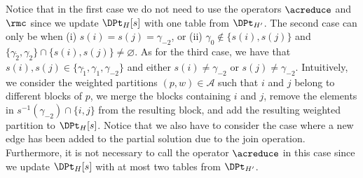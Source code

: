 Notice that in the first case we do not need to use the operators $\acreduce$ and $\rmc$ since we update
$\DPt_H[s]$ with one table from $\DPt_{H'}$.
The second case can only be when (i) $s(i)=s(j)=\gamma_{-2}$,
or (ii) $\gamma_0 \notin \{s(i),s(j)\}$ and
$\{\gamma_{\tilde{2}},\gamma_{2}\} \cap \{s(i),s(j)\} \neq \varnothing$.
As for the third case, we have that $s(i),s(j) \in \{\gamma_{\tilde{1}}, \gamma_{1}, \gamma_{-2}\}$ and
either $s(i) \neq \gamma_{-2}$ or $s(j) \neq \gamma_{-2}$.
Intuitively, we consider the weighted partitions $(p,w) \in \mathcal{A}$ such that
$i$ and $j$ belong to different blocks of $p$,
we merge the blocks containing $i$ and $j$,
remove the elements in $s^{-1}(\gamma_{-2}) \cap \{i,j\}$ from the resulting block,
and add the resulting weighted partition to $\DPt_H[s]$.
Notice that we also have to consider the case where a new edge has been added to the partial solution due to the join operation.
Furthermore, it is not necessary to call the operator $\acreduce$ in this case since we update $\DPt_H[s]$ with at most two tables from $\DPt_{H'}$.






